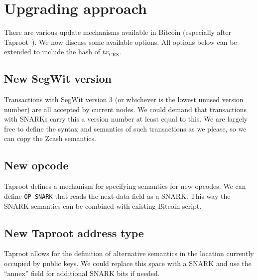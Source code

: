 \section{Upgrading approach}
  There are various update mechanisms available in Bitcoin (especially after
  Taproot~\cite{TODO:taproot}). We now discuss some available options. All
  options below can be extended to include the hash of
  $\mathit{tx}_{\mathrm{CRS}}$.
  \subsection{New SegWit version}
    Transactions with SegWit version 3 (or whichever is the lowest unused
    version number) are all accepted by current nodes. We could demand that
    transactions with SNARKs carry this a version number at least equal to this.
    We are largely free to define the syntax and semantics of such transactions
    as we please, so we can copy the Zcash semantics.
  \subsection{New opcode}
    Taproot defines a mechanism for specifying semantics for new opcodes. We can
    define \texttt{OP\_SNARK} that reads the next data field as a SNARK. This
    way the SNARK semantics can be combined with existing Bitcoin script.
  \subsection{New Taproot address type}
    Taproot allows for the definition of alternative semantics in the location
    currently occupied by public keys. We could replace this space with a SNARK
    and use the ``annex'' field for additional SNARK bits if needed.
